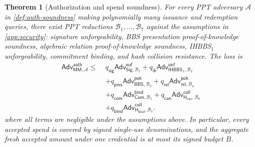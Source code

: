 \documentclass[letterpaper]{article}
\newcommand{\adv}{\mathcal{A}}
\newcommand{\commit}{\mathsf{Com}}
\newcommand{\hash}{\mathsf{H}_{\mathsf{can}}}
\newcommand{\hashBind}{\mathsf{H}_{\mathsf{bind}}}
\newcommand{\sig}{\mathsf{Sig}}
\newcommand{\bbs}{\mathsf{BBS}}
\newcommand{\MM}{\mathsf{MM}}
\newcommand{\Adv}{\mathsf{Adv}}
\newtheorem{theorem}{Theorem}
\begin{document}
\begin{theorem}[Authorization and spend soundness]
\label{thm:auth-soundness}
For every PPT adversary $\adv$ in \cref{def:auth-soundness} making
polynomially many issuance and redemption queries, there exist PPT reductions
\(\mathcal{B}_1,\ldots,\mathcal{B}_7\) against the assumptions in
\cref{app:security}: signature unforgeability, BBS presentation
proof-of-knowledge soundness, algebraic relation proof-of-knowledge soundness,
IHBBS\(_1\) unforgeability,
commitment binding, and hash collision resistance. The loss is
\begin{equation}
\begin{aligned}
  \Adv^{\mathsf{auth}}_{\MM,\adv}
  \le\;&q_{\mathsf{sig}}\Adv^{\mathsf{euf}}_{\sig,\mathcal{B}_1}
  +q_{\mathsf{ih}}\Adv^{\mathsf{unf}}_{\mathsf{IHBBS}_1,\mathcal{B}_2}\\
  &+q_{\mathsf{pres}}\Adv^{\mathsf{pok}}_{\bbs,\mathcal{B}_3}
  +q_{\mathsf{rel}}\Adv^{\mathsf{pok}}_{\mathsf{rel},\mathcal{B}_4}\\
  &+q_{\mathsf{com}}\Adv^{\mathsf{bind}}_{\commit,\mathcal{B}_5}
  +q_{\mathsf{can}}\Adv^{\mathsf{coll}}_{\hash,\mathcal{B}_6}\\
  &+q_{\mathsf{bind}}\Adv^{\mathsf{coll}}_{\hashBind,\mathcal{B}_7}.
\end{aligned}
\label{eq:auth-soundness-bound}
\end{equation}
where all terms are negligible under the assumptions above. In particular,
every accepted spend is covered by signed single-use denominations, and the
aggregate fresh accepted amount under one credential is at most its signed
budget \(B\).
\end{theorem}
\end{document}
